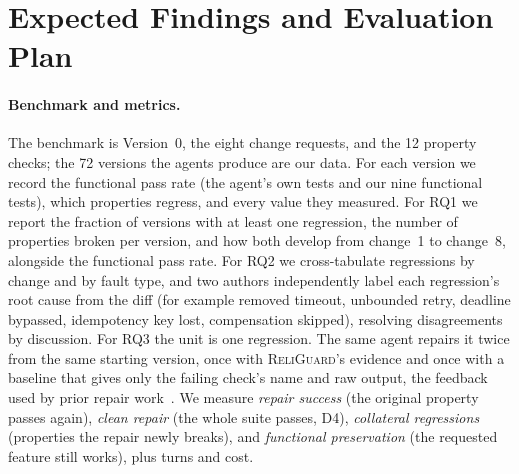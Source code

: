 
\section{Expected Findings and Evaluation Plan}
\label{sec:expected}

\paragraph{Benchmark and metrics.}
The benchmark is Version~0, the eight change requests, and the 12 property checks; the 72 versions
the agents produce are our data. For each version we record the functional pass rate (the agent's
own tests and our nine functional tests), which properties regress, and every value they measured.
For RQ1 we report the fraction of versions with at least one regression, the number of properties
broken per version, and how both develop from change~1 to change~8, alongside the functional pass
rate. For RQ2 we cross-tabulate regressions by change and by fault type, and two authors
independently label each regression's root cause from the diff (for example removed timeout,
unbounded retry, deadline bypassed, idempotency key lost, compensation skipped), resolving
disagreements by discussion. For RQ3 the unit is one regression. The same agent repairs it twice
from the same starting version, once with \textsc{ReliGuard}'s evidence and once with a baseline that gives
only the failing check's name and raw output, the feedback used by prior repair
work~\cite{chen2024selfdebug,xia2024chatrepair}. We measure \emph{repair success} (the original
property passes again), \emph{clean repair} (the whole suite passes, D4), \emph{collateral
regressions} (properties the repair newly breaks), and \emph{functional preservation} (the requested
feature still works), plus turns and cost.

